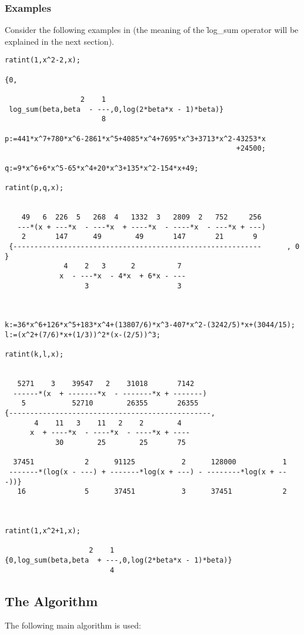 \subsubsection{Examples}
Consider the following examples in \REDUCE (the meaning of the \f{log\_sum} operator will be explained in the next section).
\begin{verbatim}
ratint(1,x^2-2,x);

{0,

                  2    1
 log_sum(beta,beta  - ---,0,log(2*beta*x - 1)*beta)}
                       8

p:=441*x^7+780*x^6-2861*x^5+4085*x^4+7695*x^3+3713*x^2-43253*x
                                                       +24500;

q:=9*x^6+6*x^5-65*x^4+20*x^3+135*x^2-154*x+49;

ratint(p,q,x);


    49   6  226  5   268  4   1332  3   2809  2   752     256
   ---*(x + ---*x  - ---*x  + ----*x  - ----*x  - ---*x + ---)
    2       147      49        49       147       21       9
 {-----------------------------------------------------------      , 0  }
              4    2   3      2          7
             x  - ---*x  - 4*x  + 6*x - ---
                   3                     3



k:=36*x^6+126*x^5+183*x^4+(13807/6)*x^3-407*x^2-(3242/5)*x+(3044/15);
l:=(x^2+(7/6)*x+(1/3))^2*(x-(2/5))^3;

ratint(k,l,x);


   5271    3    39547   2    31018       7142
  ------*(x  + -------*x  - -------*x + -------)
    5           52710        26355       26355
{------------------------------------------------,
       4    11   3    11   2    2        4
      x  + ----*x  - ----*x  - ----*x + ----
            30        25        25       75

  37451            2      91125           2      128000           1
 -------*(log(x - ---) + -------*log(x + ---) - --------*log(x + ---))}
   16              5      37451           3      37451            2



ratint(1,x^2+1,x);

                    2    1
{0,log_sum(beta,beta  + ---,0,log(2*beta*x - 1)*beta)}
                         4
\end{verbatim}

\subsection{The Algorithm}
The following main algorithm is used:

